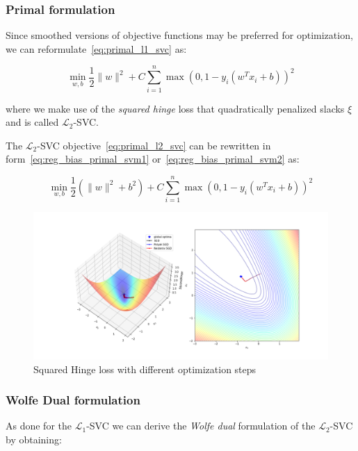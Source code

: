 \subsubsection{Primal formulation}

Since smoothed versions of objective functions may be preferred for optimization, we can reformulate~\eqref{eq:primal_l1_svc} as:

\begin{equation} \label{eq:primal_l2_svc}
    \min_{w,b} \frac{1}{2} \| w \|^2 + C \sum_{i=1}^n \max(0, 1 - y_i (w^T x_i + b))^2
\end{equation}

where we make use of the \emph{squared hinge} loss that quadratically penalized slacks $\xi$ and is called $\mathcal{L}_2$-SVC.

The $\mathcal{L}_2$-SVC objective~\eqref{eq:primal_l2_svc} can be rewritten in form~\eqref{eq:reg_bias_primal_svm1} or~\eqref{eq:reg_bias_primal_svm2} as:

\begin{equation} \label{eq:reg_bias_primal_l2_svc}
    \min_{w,b} \frac{1}{2} (\| w \|^2 + b^2) + C \sum_{i=1}^n \max(0, 1 - y_i (w^T x_i + b))^2
\end{equation}

\begin{figure}[h!]
	\centering
  	\includegraphics[scale=0.4]{img/l2_svc_loss}
  	\caption{Squared Hinge loss with different optimization steps}
  	\label{fig:l2_svc_loss}
\end{figure}

\subsubsection{Wolfe Dual formulation}

As done for the $\mathcal{L}_1$-SVC we can derive the \emph{Wolfe dual} formulation of the $\mathcal{L}_2$-SVC by obtaining:


